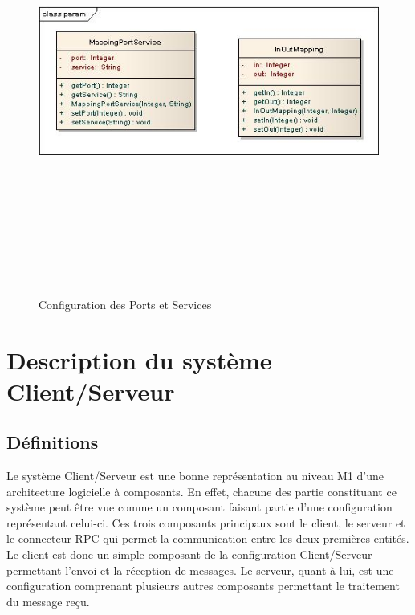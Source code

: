 \documentclass[11pt,a4paper]{article}
\begin{document}
\begin{figure}[h]
  		\centering
  		\includegraphics[height=14cm,width=15cm]{param.jpg}
  		\caption{Configuration des Ports et Services}
  		\label{Configuration des Ports et Services}
\end{figure}


\clearpage
\section{Description du système Client/Serveur}
\subsection{Définitions}
Le système Client/Serveur est une bonne représentation au niveau M1 d'une
architecture logicielle à composants. En effet, chacune des partie constituant
ce système peut être vue comme un composant faisant partie d'une configuration
représentant celui-ci. Ces trois composants principaux sont le client, le
serveur et le connecteur RPC qui permet la communication entre les deux
premières entités.\\

Le client est donc un simple composant de la configuration Client/Serveur
permettant l'envoi et la réception de messages. Le serveur, quant à lui, est
une configuration comprenant plusieurs autres composants permettant le
traitement du message reçu.
\end{document}
